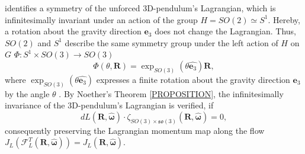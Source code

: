 \cite{Lee2008} identifies a symmetry of the unforced 3D-pendulum's Lagrangian, which is infinitesimally invariant under an action of the group $H = SO(2) \simeq S^1$. Hereby, a rotation about the gravity direction $\bm{e}_3$ does not change the Lagrangian. Thus, $SO(2)$ and $S^1$ describe the same symmetry group under the left action of $H$ on $G$ $\Phi: S^1 \times SO(3) \to SO(3)$
\begin{equation}\label{eq:continuous_3D_pendulum_symmetry_action}
    \Phi(\theta, \bm{R})= \exp_{SO(3)}(\theta \hat{\bm{e}_3})\bm{R},
\end{equation}
where $\exp_{SO(3)}(\theta \hat{\bm{e}_3})$ expresses a finite rotation about the gravity direction $\bm{e}_3$ by the angle $\theta$ \cite{Lee2008}. By Noether's Theorem \ref{PROPOSITION}, the infinitesimally invariance of the 3D-pendulum's Lagrangian is verified, if 
\begin{equation}\label{eq:continuous_3D_momentum_conservation}
    dL(\bm{R},\hat{\bm{\omega}})\cdot \zeta_{SO(3)\times\mathfrak{so}(3)}(\bm{R}, \hat{\bm{\omega}}) = 0,
\end{equation}
consequently preserving the Lagrangian momentum map along the flow $J_L\!\left(\mathcal{F}_L^T(\bm{R},\hat{\bm{\omega}})\right)=J_L(\bm{R},\hat{\bm{\omega}})$.

